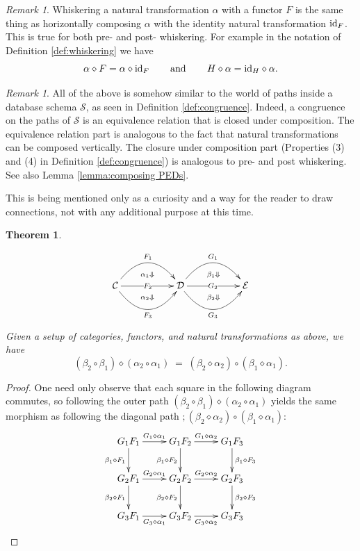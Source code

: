 \documentclass{book}
\def\tn{\textnormal}
\def\mc{\mathcal}
\def\hsp{\hspace{.3in}}
\def\Down{\Downarrow}
\def\id{\tn{id}}
\def\mcC{\mc{C}}
\def\mcD{\mc{D}}
\def\mcE{\mc{E}}
\def\mcS{\mc{S}}
\newtheorem{theorem}[subsubsection]{Theorem}
\theoremstyle{remark}
\newtheorem{remark}[subsubsection]{Remark}
\theoremstyle{definition}
\begin{document}
\begin{remark}

Whiskering a natural transformation $\alpha$ with a functor $F$ is the same thing as horizontally composing $\alpha$ with the identity natural transformation $\id_F$. This is true for both pre- and post- whiskering. For example in the notation of Definition \ref{def:whiskering} we have 
$$\alpha\diamond F = \alpha\diamond\id_F\hsp\tn{and}\hsp H\diamond\alpha=\id_H\diamond\alpha.$$

\end{remark}

\begin{remark}

All of the above is somehow similar to the world of paths inside a database schema $\mcS$, as seen in Definition \ref{def:congruence}. Indeed, a congruence on the paths of $\mcS$ is an equivalence relation that is closed under composition. The equivalence relation part is analogous to the fact that natural transformations can be composed vertically. The closure under composition part (Properties (3) and (4) in Definition \ref{def:congruence}) is analogous to pre- and post whiskering. See also Lemma \ref{lemma:composing PEDs}. 

This is being mentioned only as a curiosity and a way for the reader to draw connections, not with any additional purpose at this time.

\end{remark}

\begin{theorem}
$$
\xymatrix{
&\ar@{}[d]|(.65){\alpha_1\Down}&&\ar@{}[d]|(.65){\beta_1\Down}\\
\mcC\ar@/^2pc/[rr]^{F_1}\ar[rr]|{F_2}\ar@/_2pc/[rr]_{F_3}&&\mcD\ar@/^2pc/[rr]^{G_1}\ar[rr]|{G_2}\ar@/_2pc/[rr]_{G_3}&&\mcE\\
&\ar@{}[u]|(.65){\alpha_2\Down}&&\ar@{}[u]|(.65){\beta_2\Down}}
$$
Given a setup of categories, functors, and natural transformations as above, we have
$$(\beta_2\circ\beta_1)\diamond(\alpha_2\circ\alpha_1)\;=\;(\beta_2\diamond\alpha_2)\circ(\beta_1\diamond\alpha_1).$$

\end{theorem}

\begin{proof}

One need only observe that each square in the following diagram commutes, so following the outer path $(\beta_2\circ\beta_1)\diamond(\alpha_2\circ\alpha_1)$ yields the same morphism as following the diagonal path $;(\beta_2\diamond\alpha_2)\circ(\beta_1\diamond\alpha_1)$:
$$
\xymatrix{
G_1F_1\ar[r]^{G_1\diamond\alpha_1}\ar[d]_{\beta_1\diamond F_1}&G_1F_2\ar[r]^{G_1\diamond\alpha_2}\ar[d]_{\beta_1\diamond F_2}&G_1F_3\ar[d]^{\beta_1\diamond F_3}\\
G_2F_1\ar[r]^{G_2\diamond\alpha_1}\ar[d]_{\beta_2\diamond F_1}&G_2F_2\ar[r]^{G_2\diamond\alpha_2}\ar[d]_{\beta_2\diamond F_2}&G_2F_3\ar[d]^{\beta_2\diamond F_3}\\
G_3F_1\ar[r]_{G_3\diamond\alpha_1}&G_3F_2\ar[r]_{G_3\diamond\alpha_2}&G_3F_3
}
$$


\end{proof}
\end{document}
